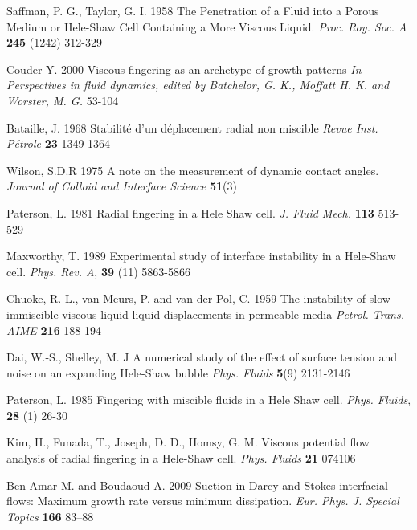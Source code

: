 \documentclass[aip,preprint,jmp,showpacs,showkeys]{revtex4-1}
\begin{document}
\normalsize
%
\begin{thebibliography}{}




{Saffman, P. G., Taylor, G. I.} 1958
{The Penetration of a Fluid into a Porous Medium or Hele-Shaw Cell Containing a More Viscous Liquid.}
\textit{Proc. Roy. Soc. A}
\textbf{245} (1242) 312-329

{Couder Y.} 2000
{Viscous fingering as an archetype of growth patterns}
\textit{In Perspectives in fluid dynamics, edited by Batchelor, G. K.,  Moffatt H. K. and  Worster, M. G. }
53-104

{Bataille, J.} 1968
{Stabilit\'e d'un déplacement radial non miscible}
\textit{Revue Inst. P\'etrole}
\textbf{23} 1349-1364

{Wilson, S.D.R} 1975
{A note on the measurement of dynamic contact angles.}
\textit{Journal of Colloid and Interface Science}
\textbf{51}(3) 

{Paterson, L.} 1981
{Radial fingering in a Hele Shaw cell.}
\textit{J. Fluid Mech.}
\textbf{113} 513-529

{Maxworthy, T.} 1989
{Experimental study of interface instability in a Hele-Shaw cell.}
\textit{Phys. Rev. A},
\textbf{39} (11) 5863-5866

{Chuoke, R. L., van Meurs, P. and van der Pol, C.} 1959
{The instability of slow immiscible viscous liquid-liquid  displacements in permeable media}
\textit{Petrol. Trans. AIME}
\textbf{216} 188-194

{Dai, W.-S., Shelley, M. J}
{A numerical study of the effect of surface tension and noise on an expanding Hele-Shaw bubble}
\textit{Phys. Fluids}
\textbf{5}(9) 2131-2146

{Paterson, L.} 1985
{Fingering with miscible fluids in a Hele Shaw cell.}
\textit{Phys. Fluids},
\textbf{28} (1) 26-30

{Kim, H., Funada, T., Joseph, D. D., Homsy, G. M.}
{Viscous potential flow analysis of radial fingering in a Hele-Shaw cell.}
\textit{Phys. Fluids}
\textbf{21} 074106

{Ben Amar M. and Boudaoud A.} 2009
Suction in Darcy and Stokes interfacial flows: Maximum growth rate versus minimum dissipation.
\textit{Eur. Phys. J. Special Topics} 
\textbf{166} 83–88


\end{thebibliography}
\end{document}
